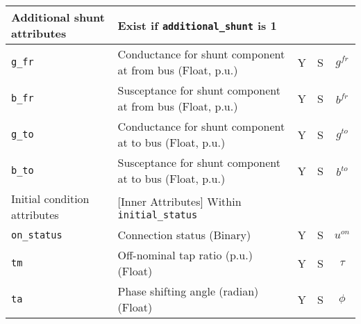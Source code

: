 \documentclass{article}
\begin{document}
\begin{center}
\small
\begin{tabular}{ l | l | c | c | c |}
  Additional shunt attributes & Exist if {\tt additional\_shunt} is 1 &  & & \\
  \hline
  {\tt g\_fr} & Conductance for shunt component at from bus (Float, p.u.)& Y & S & $g^{fr}$\\
  {\tt b\_fr} & Susceptance for shunt component at from bus (Float, p.u.)& Y & S & $b^{fr}$\\
  {\tt g\_to} & Conductance for shunt component at to bus (Float, p.u.)& Y & S & $g^{to}$\\
  {\tt b\_to} & Susceptance for shunt component at to bus (Float, p.u.)& Y & S & $b^{to}$\\
  \hline
  Initial condition attributes & [Inner Attributes] Within {\tt initial\_status} & & & \\
  \hline
  {\tt on\_status} & Connection status (Binary) & Y & S & $u^{on}$ \\
  {\tt tm} & Off-nominal tap ratio (p.u.) (Float)& Y & S & $\tau$\\
  {\tt ta} & Phase shifting angle (radian) (Float)& Y & S & $\phi$\\
  \hline
\end{tabular}
\end{center}


\end{document}
